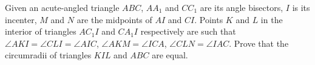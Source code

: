 Given an acute-angled triangle $ABC$,  $AA_1$ and $CC_1$ are its angle bisectors, $I$ is its incenter, $M$ and $N$ are the midpoints of $AI$ and $CI$. Points $K$ and $L$ in the interior of triangles $AC_1I$ and $CA_1I$ respectively are such that $\angle AKI = \angle CLI = \angle AIC$,  $\angle AKM = \angle ICA$,  $\angle CLN = \angle IAC$. Prove that the circumradii of triangles $KIL$ and $ABC$ are equal.